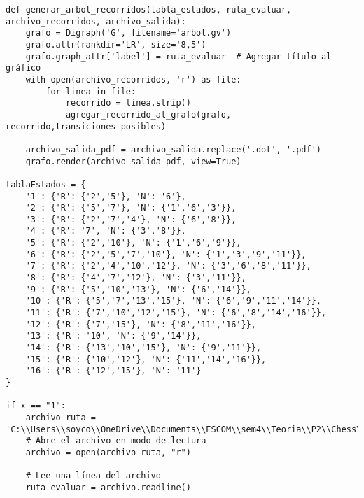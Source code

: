 \begin{enumerate}
\begin{lstlisting}
def generar_arbol_recorridos(tabla_estados, ruta_evaluar, archivo_recorridos, archivo_salida):
    grafo = Digraph('G', filename='arbol.gv')
    grafo.attr(rankdir='LR', size='8,5')
    grafo.graph_attr['label'] = ruta_evaluar  # Agregar título al gráfico
    with open(archivo_recorridos, 'r') as file:
        for linea in file:
            recorrido = linea.strip()
            agregar_recorrido_al_grafo(grafo, recorrido,transiciones_posibles)
        
    archivo_salida_pdf = archivo_salida.replace('.dot', '.pdf')
    grafo.render(archivo_salida_pdf, view=True)

tablaEstados = {
    '1': {'R': {'2','5'}, 'N': '6'},
    '2': {'R': {'5','7'}, 'N': {'1','6','3'}},
    '3': {'R': {'2','7','4'}, 'N': {'6','8'}},
    '4': {'R': '7', 'N': {'3','8'}},
    '5': {'R': {'2','10'}, 'N': {'1','6','9'}},
    '6': {'R': {'2','5','7','10'}, 'N': {'1','3','9','11'}},
    '7': {'R': {'2','4','10','12'}, 'N': {'3','6','8','11'}},
    '8': {'R': {'4','7','12'}, 'N': {'3','11'}},
    '9': {'R': {'5','10','13'}, 'N': {'6','14'}},
    '10': {'R': {'5','7','13','15'}, 'N': {'6','9','11','14'}},
    '11': {'R': {'7','10','12','15'}, 'N': {'6','8','14','16'}},
    '12': {'R': {'7','15'}, 'N': {'8','11','16'}},
    '13': {'R': '10', 'N': {'9','14'}},
    '14': {'R': {'13','10','15'}, 'N': {'9','11'}},
    '15': {'R': {'10','12'}, 'N': {'11','14','16'}},
    '16': {'R': {'12','15'}, 'N': '11'}
}

if x == "1":
    archivo_ruta = 'C:\\Users\\soyco\\OneDrive\\Documents\\ESCOM\\sem4\\Teoria\\P2\\Chess\\output\\ruta_blanca.txt'
    # Abre el archivo en modo de lectura
    archivo = open(archivo_ruta, "r")

    # Lee una línea del archivo
    ruta_evaluar = archivo.readline()


\end{lstlisting}
\end{enumerate}
